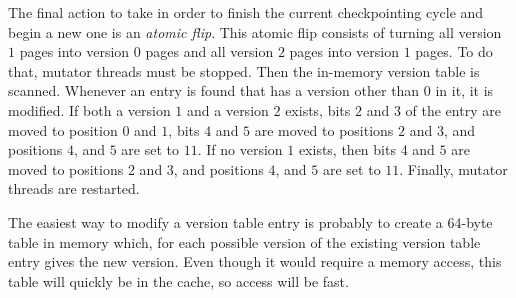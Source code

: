 The final action to take in order to finish the current checkpointing
cycle and begin a new one is an \emph{atomic flip}.  This atomic flip
consists of turning all version $1$ pages into version $0$ pages and
all version $2$ pages into version $1$ pages.  To do that, mutator
threads must be stopped.  Then the in-memory version table is scanned.
Whenever an entry is found that has a version other than $0$ in it, it
is modified.  If both a version $1$ and a version $2$ exists, bits $2$
and $3$ of the entry are moved to position $0$ and $1$, bits $4$ and
$5$ are moved to positions $2$ and $3$, and positions $4$, and $5$ are
set to $11$.  If no version $1$ exists, then bits $4$ and $5$ are
moved to positions $2$ and $3$, and positions $4$, and $5$ are set to
$11$.  Finally, mutator threads are restarted.

The easiest way to modify a version table entry is probably to create
a 64-byte table in memory which, for each possible version of the
existing version table entry gives the new version.  Even though it
would require a memory access, this table will quickly be in the
cache, so access will be fast.  


